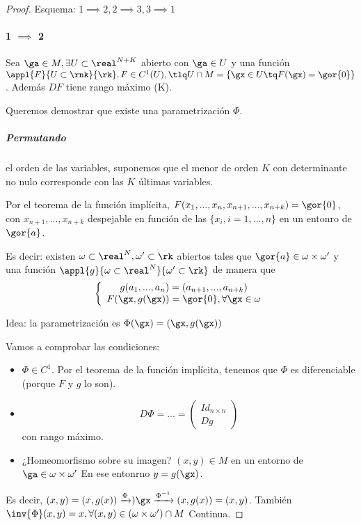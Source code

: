 \begin{proof}
Esquema: $1\implies 2, 2\implies 3, 3 \implies 1$

\paragraph{1 $\implies$ 2\\}

Sea $\ga \in M, \exists U\subset\real^{N+K}$ abierto con $\ga \in U$ y una función $\appl{F}{U\subset \rnk}{\rk}, F\in C^1(U), \tlq U\cap M = \{\gx \in U\tq F(\gx) = \gor{0}\}$. Además $DF$ tiene rango máximo (K). 

Queremos demostrar que existe una parametrización $\Phi$.
\subparagraph{Permutando} el orden de las variables, suponemos que el menor de orden $K$ con determinante no nulo corresponde con las $K$ últimas variables. 

Por el teorema de la función implícita, $F(x_1,...,x_n,x_{n+1},...,x_{n+k}) = \gor{0}$, con $x_{n+1},...,x_{n+k}$ despejable en función de las $\{x_i,i=1,...,n\}$ en un entonro de $\gor{a}$.

Es decir: existen $\omega\subset \real^N, \omega'\subset\rk$ abiertos tales que $\gor{a}\in \omega \times \omega'$ y una función $\appl{g}{\omega\subset\real^N}{\omega'\subset\rk}$ de manera que
$$\left\{\begin{array}{c}
g(a_1,...,a_n) = (a_{n+1},...,a_{n+k})\\
F(\gx,g(\gx)) = \gor{0}, \forall \gx \in \omega\end{array}\right.$$

Idea: la parametrización es $\Phi (\gx) = (\gx,g(\gx))$

Vamos a comprobar las condiciones:
\begin{itemize}
\item $\Phi \in C^1$. Por el teorema de la función implícita, tenemos que $\Phi$ es diferenciable (porque $F$ y $g$ lo son).
\item \[D\Phi = ... = 
\begin{pmatrix}
Id_{n \times n}\\
\hline
Dg
\end{pmatrix}\] con rango máximo.
\item ¿Homeomorfismo sobre su imagen? $(x,y)\in M$ en un entorno de $\ga \in \omega\times\omega'$ En ese entonrno $y=g(\gx)$.
\end{itemize}
Es decir, $(x,y) = (x,g(x)) \xrightarrow{\Phi}) \gx \xrightarrow{\Phi^{-1}} (x,g(x)) = (x,y) $. También $\inv{\Phi}(x,y) = x, \forall(x,y)\in (\omega\times\omega') \cap M$ Continua.



\end{proof}
